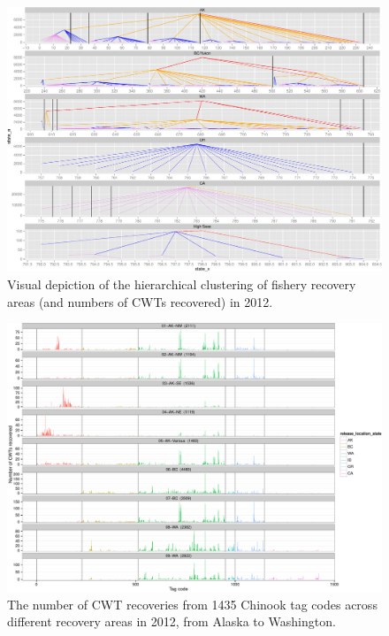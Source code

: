 \documentclass[11pt]{article}
\begin{document}
\begin{figure}
\begin{center}
\includegraphics[width=\textwidth]{images/recovery_trees_divided.pdf}
\end{center}
\caption{Visual depiction of the hierarchical clustering of fishery recovery areas (and numbers of CWTs recovered)
in 2012.}
\end{figure}


\begin{figure}
\begin{center}
\includegraphics[width=\textwidth]{images/recovery_histo_panel_1.pdf}
\end{center}
\caption{The number of CWT recoveries from 1435 Chinook tag codes across different recovery areas in 2012, from Alaska to Washington.}
\end{figure}
\end{document}
